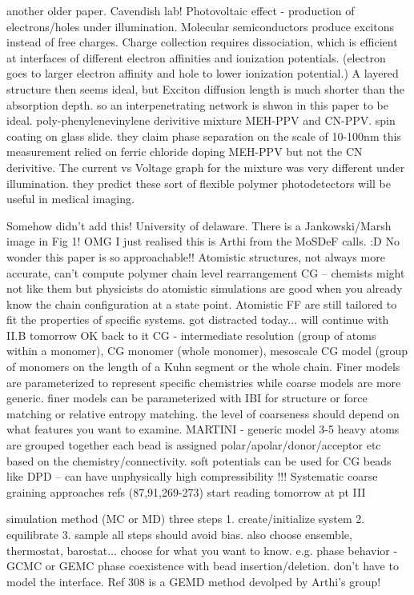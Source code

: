 \documentclass{article}
\begin{document}
\cite{Halls1995}

another older paper. Cavendish lab! Photovoltaic effect - production of electrons/holes under illumination. Molecular semiconductors produce excitons instead of free charges. Charge collection requires dissociation, which is efficient at interfaces of different electron affinities and ionization potentials. (electron goes to larger electron affinity and hole to lower ionization potential.) A layered structure then seems ideal, but Exciton diffusion length is much shorter than the absorption depth. so an interpenetrating network is shwon in this paper to be ideal.
poly-phenylenevinylene derivitive mixture MEH-PPV and CN-PPV. spin coating on glass slide. they claim phase separation on the scale of 10-100nm this measurement relied on ferric chloride doping MEH-PPV but not the CN derivitive.
The current vs Voltage graph for the mixture was very different under illumination.
they predict these sort of flexible polymer photodetectors will be useful in medical imaging.

\cite{Gartner2019a}

Somehow didn't add this!
University of delaware. There is a Jankowski/Marsh image in Fig 1!
OMG I just realised this is Arthi from the MoSDeF calls. :D No wonder this paper is so approachable!! 
Atomistic structures, not always more accurate, can't compute polymer chain level rearrangement
CG -- chemists might not like them but physicists do
atomistic simulations are good when you already know the chain configuration at a state point. Atomistic FF are still tailored to fit the properties of specific systems. got distracted today... will continue with II.B tomorrow
OK back to it
CG - intermediate resolution (group of atoms within a monomer), CG monomer (whole monomer), mesoscale CG model (group of monomers on the length of a Kuhn segment or the whole chain.
Finer models are parameterized to represent specific chemistries while coarse models are more generic. finer models can be parameterized with IBI for structure or force matching or relative entropy matching. the level of coarseness should depend on what features you want to examine.
MARTINI - generic model 3-5 heavy atoms are grouped together each bead is assigned polar/apolar/donor/acceptor etc based on the chemistry/connectivity.
soft potentials can be used for CG beads like DPD -- can have unphysically high compressibility
!!! Systematic coarse graining approaches refs (87,91,269-273)
start reading tomorrow at pt III

simulation method (MC or MD) three steps
1. create/initialize system
2. equilibrate
3. sample
all steps should avoid bias.
also choose ensemble, thermostat, barostat... choose for what you want to know. e.g. phase behavior - GCMC or GEMC phase coexistence with bead insertion/deletion. don't have to model the interface. Ref 308 is a GEMD method devolped by Arthi's group!
\end{document}
